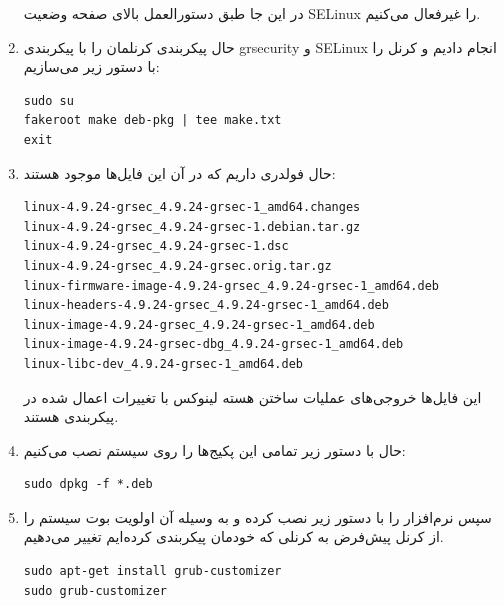 \documentclass{article}
\begin{document}
\begin{enumerate}
در این جا طبق دستورالعمل بالای صفحه وضعیت SELinux را غیرفعال می‌کنیم.

\item حال پیکربندی کرنلمان را با پیکربندی grsecurity و SELinux انجام دادیم و کرنل را با دستور زیر می‌سازیم:

\begin{latin}
\begin{verbatim}
sudo su
fakeroot make deb-pkg | tee make.txt
exit
\end{verbatim}
\end{latin}

\item حال فولدری داریم که در آن این فایل‌ها موجود هستند:
\begin{latin}
\begin{verbatim}
linux-4.9.24-grsec_4.9.24-grsec-1_amd64.changes
linux-4.9.24-grsec_4.9.24-grsec-1.debian.tar.gz
linux-4.9.24-grsec_4.9.24-grsec-1.dsc
linux-4.9.24-grsec_4.9.24-grsec.orig.tar.gz
linux-firmware-image-4.9.24-grsec_4.9.24-grsec-1_amd64.deb
linux-headers-4.9.24-grsec_4.9.24-grsec-1_amd64.deb
linux-image-4.9.24-grsec_4.9.24-grsec-1_amd64.deb
linux-image-4.9.24-grsec-dbg_4.9.24-grsec-1_amd64.deb
linux-libc-dev_4.9.24-grsec-1_amd64.deb
\end{verbatim}
\end{latin}

این فایل‌ها خروجی‌های عملیات ساختن هسته لینوکس با تغییرات اعمال شده در پیکر‌بندی هستند.

\item حال با دستور زیر تمامی این پکیج‌ها را روی سیستم نصب می‌کنیم:

\begin{latin}
\begin{verbatim}
sudo dpkg -f *.deb
\end{verbatim}
\end{latin}

\item سپس نرم‌افزار  را با دستور زیر نصب کرده و به وسیله‌ آن اولویت بوت سیستم را از کرنل پیش‌فرض به کرنلی که خودمان پیکر‌بندی کرده‌ایم تغییر می‌دهیم.

\begin{latin}
\begin{verbatim}
sudo apt-get install grub-customizer
sudo grub-customizer
\end{verbatim}
\end{latin}


\end{enumerate}
\end{document}
